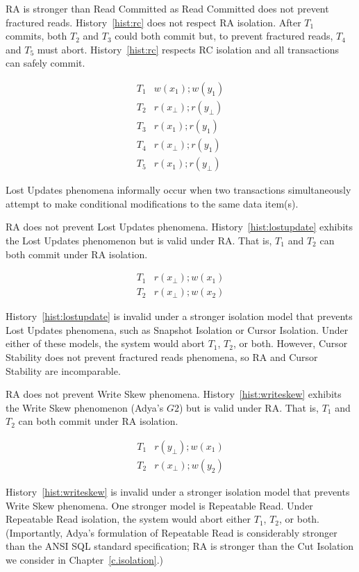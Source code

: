 RA is stronger than Read Committed as Read Committed does not prevent
fractured reads. History~\ref{hist:rc} does not respect RA
isolation. After $T_1$ commits, both $T_2$ and $T_3$ could both commit
but, to prevent fractured reads, $T_4$ and $T_5$ must
abort. History~\ref{hist:rc} respects RC isolation and all
transactions can safely commit.

\begin{eqnarray}
\label{hist:rc}
T_1 & w(x_1); w(y_1)\\
T_2 & r(x_\bot); r(y_\bot)\nonumber\\
T_3 & r(x_1); r(y_1)\nonumber\\
T_4 & r(x_\bot); r(y_1)\nonumber\\
T_5 & r(x_1); r(y_\bot)\nonumber 
\end{eqnarray}

 Lost Updates phenomena informally occur when two
transactions simultaneously attempt to make conditional modifications to
the same data item(s).

RA does not prevent Lost Updates phenomena. History~\ref{hist:lostupdate}
exhibits the Lost Updates phenomenon but is valid under RA. That is,
$T_1$ and $T_2$ can both commit under RA isolation.

\begin{eqnarray}
\label{hist:lostupdate}
T_1 & r(x_\bot); w(x_1)\\
T_2 & r(x_\bot); w(x_2)\nonumber
\end{eqnarray}

History~\ref{hist:lostupdate} is invalid under a stronger isolation
model that prevents Lost Updates phenomena, such as Snapshot Isolation
or Cursor Isolation. Under either of these models, the system would
abort $T_1$, $T_2$, or both. However, Cursor Stability does not
prevent fractured reads phenomena, so RA and Cursor Stability are
incomparable.

 RA does not prevent Write Skew
phenomena. History~\ref{hist:writeskew} exhibits the Write Skew
phenomenon (Adya's $G2$) but is valid under RA. That is, $T_1$ and
$T_2$ can both commit under RA isolation.

\begin{eqnarray}
\label{hist:writeskew}
T_1 & r(y_\bot); w(x_1)\\
T_2 & r(x_\bot); w(y_2)\nonumber
\end{eqnarray}

History~\ref{hist:writeskew} is invalid under a stronger isolation
model that prevents Write Skew phenomena. One stronger model is
Repeatable Read. Under Repeatable Read isolation, the system would
abort either $T_1$, $T_2$, or both. (Importantly, Adya's formulation
of Repeatable Read is considerably stronger than the ANSI SQL standard
specification; RA is stronger than the Cut Isolation we consider in
Chapter~\ref{c.isolation}.)


